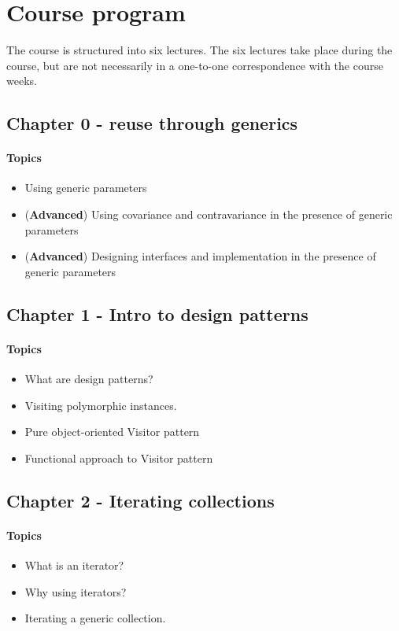 \section{Course program}
The course is structured into six lectures.
The six lectures take place during the course, but are not necessarily in a one-to-one correspondence with the course weeks.

\subsection{Chapter 0 - reuse through generics}
\paragraph*{Topics}			
\begin{itemize}
	\item Using generic parameters
	\item (\textbf{Advanced}) Using covariance and contravariance in the presence of generic parameters
	\item (\textbf{Advanced}) Designing interfaces and implementation in the presence of generic parameters
\end{itemize}

\subsection{Chapter 1 - Intro to design patterns} 
\paragraph*{Topics}
\begin{itemize}
	\item What are design patterns? 
	\item Visiting polymorphic instances. 
	\item Pure object-oriented Visitor pattern 
	\item Functional approach to Visitor pattern 
\end{itemize}

\subsection{Chapter 2 - Iterating collections}
\paragraph*{Topics}			
\begin{itemize}
	\item What is an iterator? 
	\item Why using iterators? 
	\item Iterating a generic collection. 
\end{itemize}

